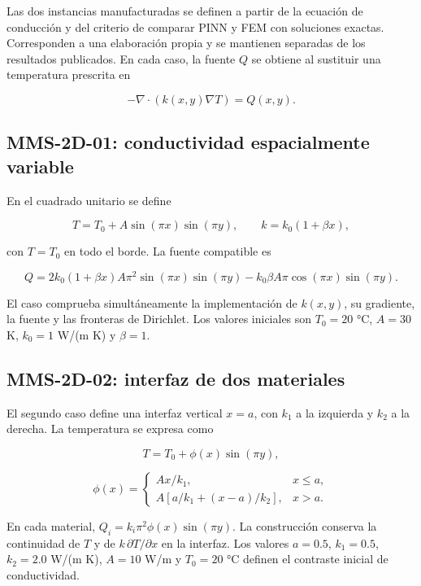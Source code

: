 \documentclass[11pt,a4paper,oneside]{report}
\begin{document}
Las dos instancias manufacturadas se definen a partir de la ecuación de
conducción y del criterio de comparar PINN y FEM con soluciones exactas.
Corresponden a una elaboración propia y se mantienen separadas de los
resultados publicados. En cada caso, la fuente \(Q\) se obtiene al
sustituir una temperatura prescrita en

\[
-\nabla\cdot\left(k(x,y)\nabla T\right)=Q(x,y).
\]

\subsection{MMS-2D-01: conductividad espacialmente
variable}\label{mms-2d-01-conductividad-espacialmente-variable}

En el cuadrado unitario se define

\[
T=T_0+A\sin(\pi x)\sin(\pi y),\qquad
k=k_0(1+\beta x),
\]

con \(T=T_0\) en todo el borde. La fuente compatible es

\[
Q=2k_0(1+\beta x)A\pi^2\sin(\pi x)\sin(\pi y)
-k_0\beta A\pi\cos(\pi x)\sin(\pi y).
\]

El caso comprueba simultáneamente la implementación de \(k(x,y)\), su
gradiente, la fuente y las fronteras de Dirichlet. Los valores iniciales
son \(T_0=20\) °C, \(A=30\) K, \(k_0=1\) W/(m K) y \(\beta=1\).

\subsection{MMS-2D-02: interfaz de dos
materiales}\label{mms-2d-02-interfaz-de-dos-materiales}

El segundo caso define una interfaz vertical \(x=a\), con \(k_1\) a la
izquierda y \(k_2\) a la derecha. La temperatura se expresa como

\[
T=T_0+\phi(x)\sin(\pi y),
\]

\[
\phi(x)=
\begin{cases}
A x/k_1, & x\le a,\\
A\left[a/k_1+(x-a)/k_2\right], & x>a.
\end{cases}
\]

En cada material, \(Q_i=k_i\pi^2\phi(x)\sin(\pi y)\). La construcción
conserva la continuidad de \(T\) y de \(k\,\partial T/\partial x\) en la
interfaz. Los valores \(a=0.5\), \(k_1=0.5\), \(k_2=2.0\) W/(m K),
\(A=10\) W/m y \(T_0=20\) °C definen el contraste inicial de
conductividad.
\end{document}
